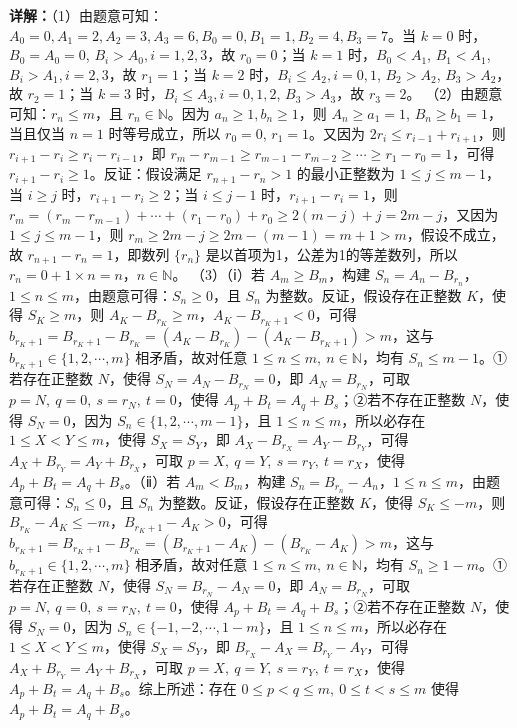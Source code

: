\begin{question}[points=15]
\begin{solution}
\textbf{详解：}（1）由题意可知：$A_0=0, A_1=2, A_2=3, A_3=6, B_0=0, B_1=1, B_2=4, B_3=7$。当 $k=0$ 时，$B_0=A_0=0$, $B_i>A_0,i=1,2,3$，故 $r_0=0$；当 $k=1$ 时，$B_0<A_1$, $B_1<A_1$, $B_i>A_1,i=2,3$，故 $r_1=1$；当 $k=2$ 时，$B_i\le A_2,i=0,1$, $B_2>A_2$, $B_3>A_2$，故 $r_2=1$；当 $k=3$ 时，$B_i\le A_3,i=0,1,2$, $B_3>A_3$，故 $r_3=2$。
（2）由题意可知：$r_n\le m$，且 $r_n\in\mathbb{N}$。因为 $a_n\ge1,b_n\ge1$，则 $A_n\ge a_1=1$, $B_n\ge b_1=1$，当且仅当 $n=1$ 时等号成立，所以 $r_0=0$, $r_1=1$。又因为 $2r_i\le r_{i-1}+r_{i+1}$，则 $r_{i+1}-r_i\ge r_i-r_{i-1}$，即 $r_m-r_{m-1}\ge r_{m-1}-r_{m-2}\ge\cdots\ge r_1-r_0=1$，可得 $r_{i+1}-r_i\ge1$。反证：假设满足 $r_{n+1}-r_n>1$ 的最小正整数为 $1\le j\le m-1$，当 $i\ge j$ 时，$r_{i+1}-r_i\ge2$；当 $i\le j-1$ 时，$r_{i+1}-r_i=1$，则 $r_m=(r_m-r_{m-1})+\cdots+(r_1-r_0)+r_0\ge2(m-j)+j=2m-j$，又因为 $1\le j\le m-1$，则 $r_m\ge2m-j\ge2m-(m-1)=m+1>m$，假设不成立，故 $r_{n+1}-r_n=1$，即数列 $\{r_n\}$ 是以首项为1，公差为1的等差数列，所以 $r_n=0+1\times n=n$，$n\in\mathbb{N}$。
（3）（ⅰ）若 $A_m\ge B_m$，构建 $S_n=A_n-B_{r_n}$，$1\le n\le m$，由题意可得：$S_n\ge0$，且 $S_n$ 为整数。反证，假设存在正整数 $K$，使得 $S_K\ge m$，则 $A_K-B_{r_K}\ge m$，$A_K-B_{r_K+1}<0$，可得 $b_{r_K+1}=B_{r_K+1}-B_{r_K}=(A_K-B_{r_K})-(A_K-B_{r_K+1})>m$，这与 $b_{r_K+1}\in\{1,2,\cdots,m\}$ 相矛盾，故对任意 $1\le n\le m,\ n\in\mathbb{N}$，均有 $S_n\le m-1$。①若存在正整数 $N$，使得 $S_N=A_N-B_{r_N}=0$，即 $A_N=B_{r_N}$，可取 $p=N,\ q=0,\ s=r_N,\ t=0$，使得 $A_p+B_t=A_q+B_s$；②若不存在正整数 $N$，使得 $S_N=0$，因为 $S_n\in\{1,2,\cdots,m-1\}$，且 $1\le n\le m$，所以必存在 $1\le X<Y\le m$，使得 $S_X=S_Y$，即 $A_X-B_{r_X}=A_Y-B_{r_Y}$，可得 $A_X+B_{r_Y}=A_Y+B_{r_X}$，可取 $p=X,\ q=Y,\ s=r_Y,\ t=r_X$，使得 $A_p+B_t=A_q+B_s$。（ⅱ）若 $A_m<B_m$，构建 $S_n=B_{r_n}-A_n$，$1\le n\le m$，由题意可得：$S_n\le0$，且 $S_n$ 为整数。反证，假设存在正整数 $K$，使得 $S_K\le -m$，则 $B_{r_K}-A_K\le -m$，$B_{r_K+1}-A_K>0$，可得 $b_{r_K+1}=B_{r_K+1}-B_{r_K}=(B_{r_K+1}-A_K)-(B_{r_K}-A_K)>m$，这与 $b_{r_K+1}\in\{1,2,\cdots,m\}$ 相矛盾，故对任意 $1\le n\le m,\ n\in\mathbb{N}$，均有 $S_n\ge 1-m$。①若存在正整数 $N$，使得 $S_N=B_{r_N}-A_N=0$，即 $A_N=B_{r_N}$，可取 $p=N,\ q=0,\ s=r_N,\ t=0$，使得 $A_p+B_t=A_q+B_s$；②若不存在正整数 $N$，使得 $S_N=0$，因为 $S_n\in\{-1,-2,\cdots,1-m\}$，且 $1\le n\le m$，所以必存在 $1\le X<Y\le m$，使得 $S_X=S_Y$，即 $B_{r_X}-A_X=B_{r_Y}-A_Y$，可得 $A_X+B_{r_Y}=A_Y+B_{r_X}$，可取 $p=X,\ q=Y,\ s=r_Y,\ t=r_X$，使得 $A_p+B_t=A_q+B_s$。综上所述：存在 $0\le p<q\le m,\ 0\le t<s\le m$ 使得 $A_p+B_t=A_q+B_s$。
\end{solution}
\end{question}

